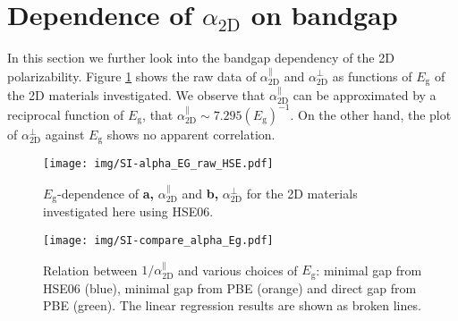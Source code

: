 \documentclass[journal=ancac3,email=true,hyperref=true,keywords=false]{achemso}
\begin{document}
\section{Dependence of $\alpha_{\mathrm{2D}}$ on bandgap}
\label{sec:pol-2D-Eg}

In this section we further look into the bandgap dependency of the 2D
polarizability. Figure \ref{fig:SI-raw-HSE} shows the raw data of
$\alpha_{\mathrm{2D}}^{\parallel}$ and $\alpha_{\mathrm{2D}}^{\perp}$
as functions of $E_{\mathrm{g}}$ of the 2D materials investigated. We
observe that $\alpha_{\mathrm{2D}}^{\parallel}$ can be approximated by
a reciprocal function of $E_{\mathrm{g}}$, that
$\alpha_{\mathrm{2D}}^{\parallel}\sim{}
7.295(E_{\mathrm{g}})^{-1}$. On the other hand, the plot of
$\alpha_{\mathrm{2D}}^{\perp}$ against $E_{\mathrm{g}}$ shows no
apparent correlation.
\begin{figure}[htbp]
  \centering
  \texttt{[image: img/SI-alpha\_EG\_raw\_HSE.pdf]}
  \caption{$E_{\mathrm{g}}$-dependence of \textbf{a,} $\alpha_{\mathrm{2D}}^{\parallel}$ and
    \textbf{b,} $\alpha_{\mathrm{2D}}^{\perp}$ for the 2D materials investigated here using HSE06.}
  \label{fig:SI-raw-HSE}
\end{figure}

\begin{figure}[htbp]
  \centering
  \texttt{[image: img/SI-compare\_alpha\_Eg.pdf]}
  \caption{Relation between $1/\alpha_{\mathrm{2D}}^{\parallel}$ and various choices
    of $E_{\mathrm{g}}$: minimal gap from HSE06 (blue), minimal gap
    from PBE (orange) and direct gap from PBE (green). The linear
    regression results are shown as broken lines.}
  \label{fig:alpha-Eg-diff}
\end{figure}
\end{document}
